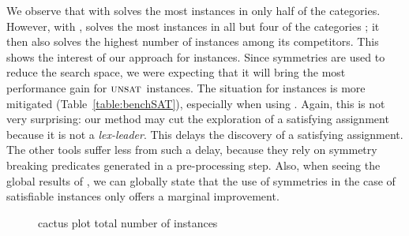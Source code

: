 We observe that \cdclsym{} with \saucy{} solves the most instances in only half
of the \unsat categories. However, with \bliss{}, \cdclsym{} solves the most
instances in all but four of the \unsat categories ; it then also solves the
highest number of instances among its competitors. This shows the interest
of our approach for \unsat instances. Since symmetries are used to reduce the
search space, we were expecting that it will bring the most performance gain
for $\textsc{unsat}$ instances.
The situation for \sat instances is more mitigated (Table~\ref{table:benchSAT}),
especially when using \saucy{}. Again, this is not very surprising: our method
may cut the exploration of a satisfying assignment because it is not a
\textit{lex-leader}. This delays the discovery of a satisfying assignment. The
other tools suffer less from such a delay, because they rely on symmetry
breaking predicates generated in a pre-processing step. Also, when seeing the
global results of \minisat{}, we can globally state that the use of symmetries
in the case of satisfiable instances only offers a marginal improvement.
\begin{figure}[!htbp]
 \centering
 \qquad
 \caption{cactus plot  total number of instances}%
 \label{fig:cactus}%
\end{figure}
